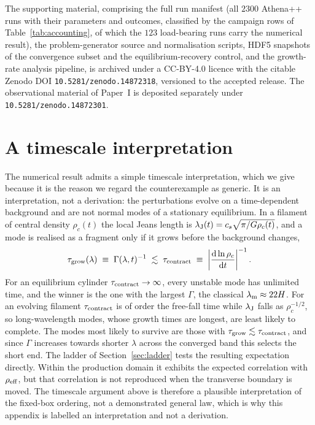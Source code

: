 \documentclass[usenatbib,twoside,twocolumn]{mnras}
\begin{document}
The supporting material, comprising the full run manifest (all $2300$ Athena++ runs with their parameters and outcomes, classified by the campaign rows of Table~\ref{tab:accounting}, of which the $123$ load-bearing runs carry the numerical result), the problem-generator source and normalisation scripts, HDF5 snapshots of the convergence subset and the equilibrium-recovery control, and the growth-rate analysis pipeline, is archived under a CC-BY-4.0 licence with the citable Zenodo DOI \texttt{10.5281/zenodo.14872318}, versioned to the accepted release. The observational material of Paper~I is deposited separately under \texttt{10.5281/zenodo.14872301}.

\nocite{PaperI}


\appendix

\section{A timescale interpretation}
\label{sec:timescale}

The numerical result admits a simple timescale interpretation, which we give because it is the reason we regard the counterexample as generic. It is an interpretation, not a derivation: the perturbations evolve on a time-dependent background and are not normal modes of a stationary equilibrium. In a filament of central density $\rho_c(t)$ the local Jeans length is $\lambda_{\rm J}(t)=c_s\sqrt{\pi/G\rho_c(t)}$, and a mode is realised as a fragment only if it grows before the background changes,
\begin{equation}
\tau_{\rm grow}(\lambda)\;\equiv\;\Gamma(\lambda,t)^{-1}\;\lesssim\;\tau_{\rm contract}\;\equiv\;\left|\frac{{\rm d}\ln\rho_c}{{\rm d}t}\right|^{-1}.
\label{eq:freezeout}
\end{equation}
For an equilibrium cylinder $\tau_{\rm contract}\to\infty$, every unstable mode has unlimited time, and the winner is the one with the largest $\Gamma$, the classical $\lambda_{\rm m}\approx22H$. For an evolving filament $\tau_{\rm contract}$ is of order the free-fall time while $\lambda_{\rm J}$ falls as $\rho_c^{-1/2}$, so long-wavelength modes, whose growth times are longest, are least likely to complete. The modes most likely to survive are those with $\tau_{\rm grow}\lesssim\tau_{\rm contract}$, and since $\Gamma$ increases towards shorter $\lambda$ across the converged band this selects the short end. The ladder of Section~\ref{sec:ladder} tests the resulting expectation directly. Within the production domain it exhibits the expected correlation with $\rho_{\rm eff}$, but that correlation is not reproduced when the transverse boundary is moved. The timescale argument above is therefore a plausible interpretation of the fixed-box ordering, not a demonstrated general law, which is why this appendix is labelled an interpretation and not a derivation.
\end{document}
